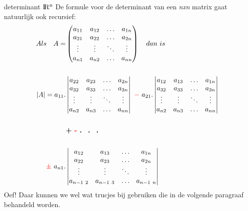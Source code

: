 \documentclass[hidelinks, a4wide, 12pt,  twoside]{book}
\begin{document}
\mydef
{determinant  ${\rm I\!R^{n}}$}
{De formule voor de determinant van een \textit{nxn} matrix gaat natuurlijk ook recursief:   \begin{align*}
	Als \quad A  = 
	&\begin{pmatrix}
	a_{11} &  a_{12}  & \ldots & a_{1n}\\
	a_{21}  &  a_{22} & \ldots & a_{2n}\\
	\vdots & \vdots & \ddots & \vdots\\
	a_{n1}  &   a_{n2}       &\ldots & a_{nn}
	\end{pmatrix} 	 \quad  dan \  is  \\ \\
	|A| = a_{11} .   	 
	&\begin{vmatrix}
	a_{22}  &  a_{23} & \ldots & a_{2n}\\
	a_{32}  &  a_{33} & \ldots & a_{3n}\\
	\vdots & \vdots & \ddots & \vdots\\
	a_{n2}  &   a_{n3}       &\ldots & a_{nn}
	\end{vmatrix} 
	\ {\color{red}-}  \ a_{21} .   	
	\begin{vmatrix}
	a_{12} &  a_{13}  & \ldots & a_{1n}\\
	a_{32}  &  a_{33} & \ldots & a_{3n}\\
	\vdots & \vdots & \ddots & \vdots\\
	a_{n2}  &   a_{n3}       &\ldots & a_{nn}
	\end{vmatrix} \\ \\
	&\textbf{+ {\color{red}-}  . \  . \ . }\\ \\
	{\color{red}\pm \ } a_{n1} .   
	&\begin{vmatrix}
	a_{12} &  a_{13}  & \ldots & a_{1n}\\
	a_{22}  &  a_{23} & \ldots & a_{2n}\\
	\vdots & \vdots & \ddots & \vdots\\
	a_{n-1 \ 2}  &   a_{n-1 \ 3}       &\ldots & a_{n-1 \ n}
	\end{vmatrix} 
	\end{align*}
}
Oef! Daar kunnen we wel wat trucjes bij gebruiken die in de volgende paragraaf behandeld worden.
\end{document}
